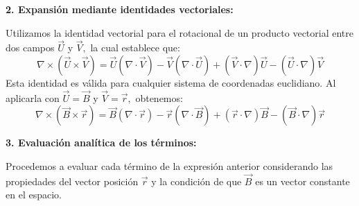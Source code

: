 \documentclass[a4paper]{article}
\begin{document}
\textbf{2. Expansión mediante identidades vectoriales:}

Utilizamos la identidad vectorial para el rotacional de un producto vectorial entre dos campos $\vec{U}$ y $\vec{V},$ la cual establece que:
\begin{equation}
\nabla \times (\vec{U} \times \vec{V}) = \vec{U}(\nabla \cdot \vec{V}) - \vec{V}(\nabla \cdot \vec{U}) + (\vec{V} \cdot \nabla)\vec{U} - (\vec{U} \cdot \nabla)\vec{V}
\end{equation}
Esta identidad es válida para cualquier sistema de coordenadas euclidiano. Al aplicarla con $\vec{U} = \vec{B}$ y $\vec{V} = \vec{r},$ obtenemos:
\begin{equation}
\nabla \times (\vec{B} \times \vec{r}) = \vec{B}(\nabla \cdot \vec{r}) - \vec{r}(\nabla \cdot \vec{B}) + (\vec{r} \cdot \nabla)\vec{B} - (\vec{B} \cdot \nabla)\vec{r}
\end{equation}

\textbf{3. Evaluación analítica de los términos:}

Procedemos a evaluar cada término de la expresión anterior considerando las propiedades del vector posición $\vec{r}$ y la condición de que $\vec{B}$ es un vector constante en el espacio.
\end{document}
